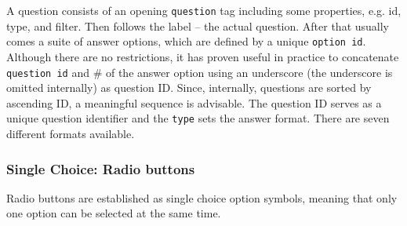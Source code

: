 \documentclass[11pt,a4paper,titlepage]{article}
\begin{document}
A question consists of an opening \texttt{question} tag including some properties, e.g. id, type, and filter. Then follows the label -- the actual question. After that usually comes a suite of answer options, which are defined by a unique \texttt{option id}. Although there are no restrictions, it has proven useful in practice to concatenate \texttt{question id} and \# of the answer option using an underscore (the underscore is omitted internally) as question ID. Since, internally, questions are sorted by ascending ID, a meaningful sequence is advisable. The question ID serves as a unique question identifier and the \texttt{type} sets the answer format. There are seven different formats available.


\subsubsection{Single Choice: Radio buttons}

Radio buttons are established as single choice option symbols, meaning that only one option can be selected at the same time.
\end{document}
